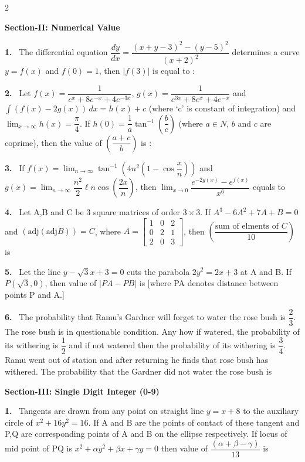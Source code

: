 \documentclass[10pt]{extarticle}
\newcommand{\sect}[1]{\par\smallskip\noindent\textbf{#1}\par}
\newcommand{\qn}[1]{\par\smallskip\noindent\textbf{#1.}~}
\begin{document}
\begin{multicols}{2}
\sect{Section-II: Numerical Value}

\qn{1} The differential equation $\dfrac{dy}{dx}=\dfrac{(x+y-3)^2-(y-5)^2}{(x+2)^2}$ determines a curve $y=f(x)$ and $f(0)=1$, then $|f(3)|$ is equal to :

\qn{2} Let $f(x)=\dfrac{1}{e^x+8e^{-x}+4e^{-3x}}$, $g(x)=\dfrac{1}{e^{3x}+8e^{x}+4e^{-x}}$ and $\displaystyle\int(f(x)-2g(x))\,dx=h(x)+c$ (where `c' is constant of integration) and $\displaystyle\lim_{x\to\infty}h(x)=\dfrac{\pi}{4}$. If $h(0)=\dfrac1a\tan^{-1}\left(\dfrac bc\right)$ (where $a\in N$, $b$ and $c$ are coprime), then the value of $\left(\dfrac{a+c}{b}\right)$ is :

\qn{3} If $f(x)=\displaystyle\lim_{n\to\infty}\tan^{-1}\left(4n^2\left(1-\cos\dfrac xn\right)\right)$ and $g(x)=\displaystyle\lim_{n\to\infty}\dfrac{n^2}{2}\ell n\cos\left(\dfrac{2x}{n}\right)$, then $\displaystyle\lim_{x\to0}\dfrac{e^{-2g(x)}-e^{f(x)}}{x^6}$ equals to

\qn{4} Let A,B and C be 3 square matrices of order $3\times3$. If $A^3-6A^2+7A+B=0$ and $(\mathrm{adj}(\mathrm{adj}B))=C$, where $A=\begin{bmatrix}1&0&2\\0&2&1\\2&0&3\end{bmatrix}$, then $\left(\dfrac{\text{sum of elments of }C}{10}\right)$ is

\qn{5} Let the line $y-\sqrt3x+3=0$ cuts the parabola $2y^2=2x+3$ at A and B. If $P\left(\sqrt3,0\right)$, then value of $|PA-PB|$ is [where PA denotes distance between points P and A.]

\qn{6} The probability that Ramu's Gardner will forget to water the rose bush is $\dfrac23$. The rose bush is in questionable condition. Any how if watered, the probability of its withering is $\dfrac12$ and if not watered then the probability of its withering is $\dfrac34$. Ramu went out of station and after returning he finds that rose bush has withered. The probability that the Gardner did not water the rose bush is

\sect{Section-III: Single Digit Integer (0-9)}

\qn{1} Tangents are drawn from any point on straight line $y=x+8$ to the auxiliary circle of $x^2+16y^2=16$. If A and B are the points of contact of these tangent and P,Q are corresponding points of A and B on the ellipse respectively. If locus of mid point of PQ is $x^2+\alpha y^2+\beta x+\gamma y=0$ then value of $\dfrac{(\alpha+\beta-\gamma)}{13}$ is


\end{multicols}
\end{document}
